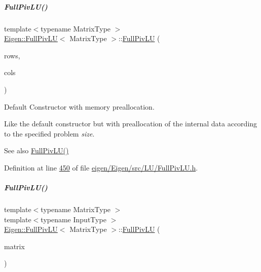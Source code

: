 \mbox{\label{group___l_u___module_ae83ebd2a24088f04e3ac835b0dc001e1}} 
\subparagraph{\texorpdfstring{Full\+Piv\+L\+U()}{FullPivLU()}\hspace{0.1cm}{\footnotesize\ttfamily [2/8]}}
{\footnotesize\ttfamily template$<$typename Matrix\+Type $>$ \\
\hyperlink{group___l_u___module_class_eigen_1_1_full_piv_l_u}{Eigen\+::\+Full\+Piv\+LU}$<$ Matrix\+Type $>$\+::\hyperlink{group___l_u___module_class_eigen_1_1_full_piv_l_u}{Full\+Piv\+LU} (\begin{DoxyParamCaption}\item[{\hyperlink{group___core___module_a554f30542cc2316add4b1ea0a492ff02}{Index}}]{rows,  }\item[{\hyperlink{group___core___module_a554f30542cc2316add4b1ea0a492ff02}{Index}}]{cols }\end{DoxyParamCaption})}



Default Constructor with memory preallocation. 

Like the default constructor but with preallocation of the internal data according to the specified problem {\itshape size}. \begin{DoxySeeAlso}{See also}
\hyperlink{group___l_u___module_af225528d1c6e623a2b1dce091907d13e}{Full\+Piv\+L\+U()} 
\end{DoxySeeAlso}


Definition at line \hyperlink{eigen_2_eigen_2src_2_l_u_2_full_piv_l_u_8h_source_l00450}{450} of file \hyperlink{eigen_2_eigen_2src_2_l_u_2_full_piv_l_u_8h_source}{eigen/\+Eigen/src/\+L\+U/\+Full\+Piv\+L\+U.\+h}.

\mbox{\label{group___l_u___module_a31a6a984478a9f721f367667fe4c5ab1}} 
\subparagraph{\texorpdfstring{Full\+Piv\+L\+U()}{FullPivLU()}\hspace{0.1cm}{\footnotesize\ttfamily [3/8]}}
{\footnotesize\ttfamily template$<$typename Matrix\+Type $>$ \\
template$<$typename Input\+Type $>$ \\
\hyperlink{group___l_u___module_class_eigen_1_1_full_piv_l_u}{Eigen\+::\+Full\+Piv\+LU}$<$ Matrix\+Type $>$\+::\hyperlink{group___l_u___module_class_eigen_1_1_full_piv_l_u}{Full\+Piv\+LU} (\begin{DoxyParamCaption}\item[{const \hyperlink{group___core___module_struct_eigen_1_1_eigen_base}{Eigen\+Base}$<$ Input\+Type $>$ \&}]{matrix }\end{DoxyParamCaption})\hspace{0.3cm}{\ttfamily [explicit]}}

